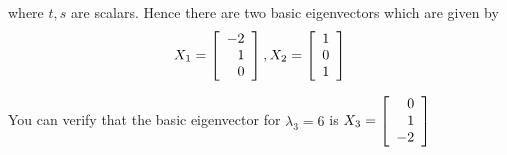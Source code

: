 \begin{solution}
where $t,s$ are scalars. Hence there are two basic eigenvectors which are given by
\begin{equation*}
X_1
=
\left[
\begin{array}{r}
-2 \\
1 \\
0
\end{array}
\right],
X_2
=
\left[
\begin{array}{r}
1 \\
0 \\
1
\end{array}
\right]
\end{equation*}

You can verify that the basic eigenvector for $\lambda_3 =6$ is $ X_3 = \left[
\begin{array}{r}
0 \\
1 \\
-2
\end{array}
\right]$


\end{solution}
